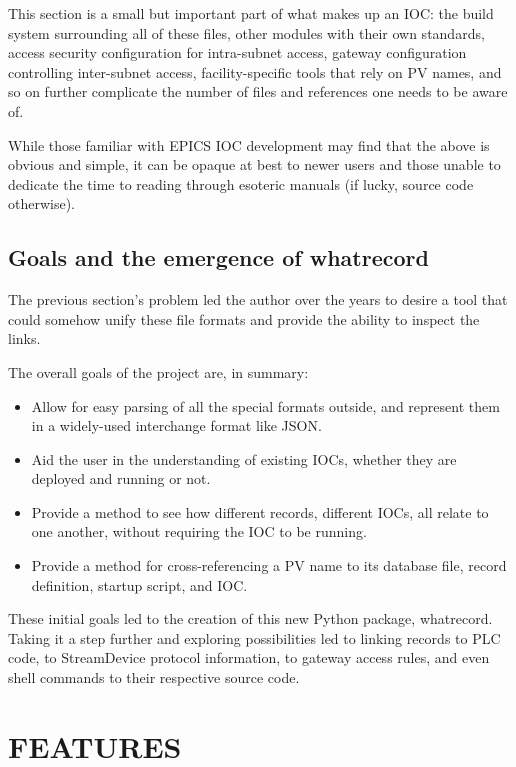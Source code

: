 \documentclass[letter,
               keeplastbox,   %
               ]{jacow}
\begin{document}
This section is a small but important part of what makes up an IOC: the build
system surrounding all of these files, other modules with their own standards,
access security configuration for intra-subnet access, gateway configuration
controlling inter-subnet access, facility-specific tools that rely on PV
names, and so on further complicate the number of files and references
one needs to be aware of.

While those familiar with EPICS IOC development may find that the above is
obvious and simple, it can be opaque at best to newer users and those unable to
dedicate the time to reading through esoteric manuals (if lucky, source code
otherwise).

\subsection{Goals and the emergence of whatrecord}

The previous section's problem led the author over the years to desire a tool
that could somehow unify these file formats and provide the ability to inspect
the links.

The overall goals of the project are, in summary:
\begin{itemize}
  \item Allow for easy parsing of all the special formats outside, and
    represent them in a widely-used interchange format like JSON.
  \item Aid the user in the understanding of existing IOCs, whether they are
    deployed and running or not.
  \item Provide a method to see how different records, different IOCs, all
    relate to one another, without requiring the IOC to be running.
  \item Provide a method for cross-referencing a PV name to its database
    file, record definition, startup script, and IOC.
\end{itemize}

These initial goals led to the creation of this new Python package, whatrecord.
Taking it a step further and exploring possibilities led to linking records to
PLC code, to StreamDevice protocol information, to gateway access rules, 
and even shell commands to their respective source code.

\section{FEATURES}
\end{document}
